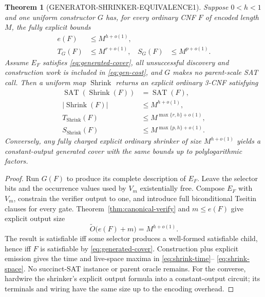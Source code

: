 \documentclass[11pt]{article}
\newtheorem{theorem}{Theorem}[section]
\newcommand{\SAT}{\operatorname{SAT}}
\begin{document}
\begin{theorem}[GENERATOR-SHRINKER-EQUIVALENCE1]
\label{thm:generator-collapse}
Suppose $0<h<1$ and one uniform constructor $G$ has, for every ordinary CNF
$F$ of encoded length $M$, the fully explicit bounds
\begin{align}
 e(F)&\le M^{h+o(1)},\label{eq:gen-size}\\
 T_G(F)&\le M^{r+o(1)}, &
 S_G(F)&\le M^{p+o(1)}.\label{eq:gen-cost}
\end{align}
Assume $E_F$ satisfies \eqref{eq:generated-cover}, all unsuccessful
discovery and construction work is included in \eqref{eq:gen-cost}, and $G$
makes no parent-scale SAT call.  Then a uniform map
$\operatorname{Shrink}$ returns an explicit ordinary 3-CNF satisfying
\begin{align}
 \SAT(\operatorname{Shrink}(F))&=\SAT(F),\label{eq:shrink-eq}\\
 |\operatorname{Shrink}(F)|&\le M^{h+o(1)},\label{eq:shrink-size}\\
 T_{\operatorname{Shrink}}(F)&\le
 M^{\max\{r,h\}+o(1)},\label{eq:shrink-time}\\
 S_{\operatorname{Shrink}}(F)&\le
 M^{\max\{p,h\}+o(1)}.\label{eq:shrink-space}
\end{align}
Conversely, any fully charged explicit ordinary shrinker of size
$M^{h+o(1)}$ yields a constant-output generated cover with the same bounds up
to polylogarithmic factors.
\end{theorem}

\begin{proof}
Run $G(F)$ to produce its complete description of $E_F$.  Leave the selector
bits and the occurrence values used by $V_m$ existentially free.  Compose
$E_F$ with $V_m$, constrain the verifier output to one, and introduce full
biconditional Tseitin clauses for every gate.  Theorem~\ref{thm:canonical-verify}
and $m\le e(F)$ give explicit output size
\[
 \widetilde O\bigl(e(F)+m\bigr)=M^{h+o(1)}.
\]
The result is satisfiable iff some selector produces a well-formed
satisfiable child, hence iff $F$ is satisfiable by
\eqref{eq:generated-cover}.  Construction plus explicit emission gives the
time and live-space maxima in \eqref{eq:shrink-time}--
\eqref{eq:shrink-space}.  No succinct-SAT instance or parent oracle remains.
For the converse, hardwire the shrinker's explicit output formula into a
constant-output circuit; its terminals and wiring have the same size up to
the encoding overhead.
\end{proof}
\end{document}
